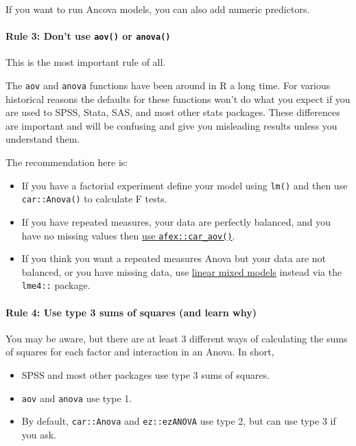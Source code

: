 \documentclass[]{article}
\providecommand{\tightlist}{%
  \setlength{\itemsep}{0pt}\setlength{\parskip}{0pt}}
\let\oldparagraph\paragraph
\renewcommand{\paragraph}[1]{\oldparagraph{#1}\mbox{}}
\theoremstyle{definition}
\theoremstyle{definition}
\theoremstyle{definition}
\theoremstyle{remark}
\begin{document}
If you want to run Ancova models, you can also add numeric predictors.

\paragraph{\texorpdfstring{Rule 3: Don't use \texttt{aov()} or
\texttt{anova()}}{Rule 3: Don't use aov() or anova()}}\label{rule-3-dont-use-aov-or-anova}

This is the most important rule of all.

The \texttt{aov} and \texttt{anova} functions have been around in R a
long time. For various historical reasons the defaults for these
functions won't do what you expect if you are used to SPSS, Stata, SAS,
and most other stats packages. These differences are important and will
be confusing and give you misleading results unless you understand them.

The recommendation here is:

\begin{itemize}
\item
  If you have a factorial experiment define your model using
  \texttt{lm()} and then use \texttt{car::Anova()} to calculate F tests.
\item
  If you have repeated measures, your data are perfectly balanced, and
  you have no missing values then
  \protect\hyperlink{repeated-measures}{use \texttt{afex::car\_aov()}}.
\item
  If you think you want a repeated measures Anova but your data are not
  balanced, or you have missing data, use
  \protect\hyperlink{multilevel-models}{linear mixed models} instead via
  the \texttt{lme4::} package.
\end{itemize}

\hypertarget{sums-squares}{\paragraph{Rule 4: Use type 3 sums of squares
(and learn why)}\label{sums-squares}}

You may be aware, but there are at least 3 different ways of calculating
the sums of squares for each factor and interaction in an Anova. In
short,

\begin{itemize}
\tightlist
\item
  SPSS and most other packages use type 3 sums of squares.
\item
  \texttt{aov} and \texttt{anova} use type 1.
\item
  By default, \texttt{car::Anova} and \texttt{ez::ezANOVA} use type 2,
  but can use type 3 if you ask.
\end{itemize}
\end{document}

